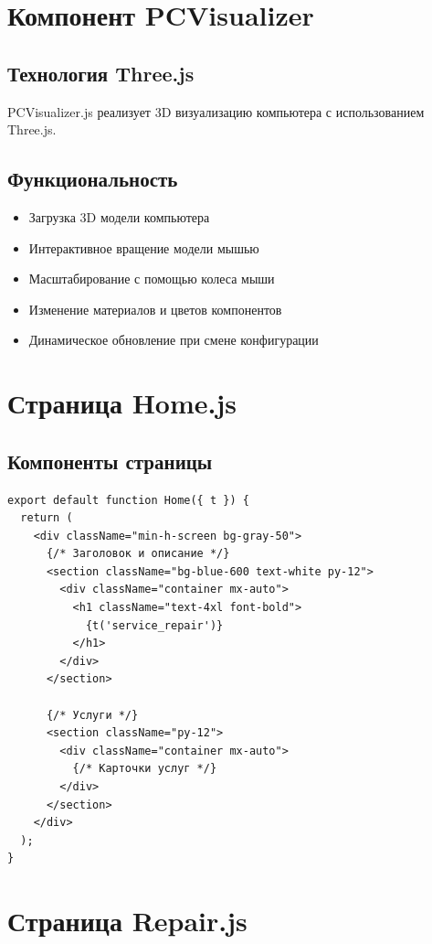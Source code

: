 \documentclass[12pt,a4paper]{report}
\begin{document}
\section{Компонент PCVisualizer}

\subsection{Технология Three.js}
PCVisualizer.js реализует 3D визуализацию компьютера с использованием Three.js.

\subsection{Функциональность}
\begin{itemize}
    \item Загрузка 3D модели компьютера
    \item Интерактивное вращение модели мышью
    \item Масштабирование с помощью колеса мыши
    \item Изменение материалов и цветов компонентов
    \item Динамическое обновление при смене конфигурации
\end{itemize}

\section{Страница Home.js}

\subsection{Компоненты страницы}
\begin{lstlisting}
export default function Home({ t }) {
  return (
    <div className="min-h-screen bg-gray-50">
      {/* Заголовок и описание */}
      <section className="bg-blue-600 text-white py-12">
        <div className="container mx-auto">
          <h1 className="text-4xl font-bold">
            {t('service_repair')}
          </h1>
        </div>
      </section>
      
      {/* Услуги */}
      <section className="py-12">
        <div className="container mx-auto">
          {/* Карточки услуг */}
        </div>
      </section>
    </div>
  );
}
\end{lstlisting}

\section{Страница Repair.js}
\end{document}
